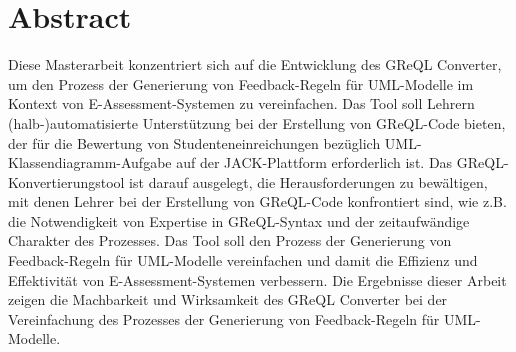{\let\clearpage\relax \chapter*{Abstract}}
Diese Masterarbeit konzentriert sich auf die Entwicklung des GReQL Converter, um den Prozess der Generierung
von Feedback-Regeln für UML-Modelle im Kontext von E-Assessment-Systemen zu vereinfachen. Das Tool soll Lehrern
(halb-)automatisierte Unterstützung bei der Erstellung von GReQL-Code bieten, der für die Bewertung von
Studenteneinreichungen bezüglich UML-Klassendiagramm-Aufgabe auf der JACK-Plattform erforderlich ist.
Das GReQL-Konvertierungstool ist darauf ausgelegt, die Herausforderungen zu bewältigen, mit denen Lehrer bei der
Erstellung von GReQL-Code konfrontiert sind, wie z.B. die Notwendigkeit von Expertise in GReQL-Syntax und der
zeitaufwändige Charakter des Prozesses. Das Tool soll den Prozess der Generierung von Feedback-Regeln für
UML-Modelle vereinfachen und damit die Effizienz und Effektivität von E-Assessment-Systemen verbessern. Die Ergebnisse
dieser Arbeit zeigen die Machbarkeit und Wirksamkeit des GReQL Converter bei der Vereinfachung des Prozesses der
Generierung von Feedback-Regeln für UML-Modelle.